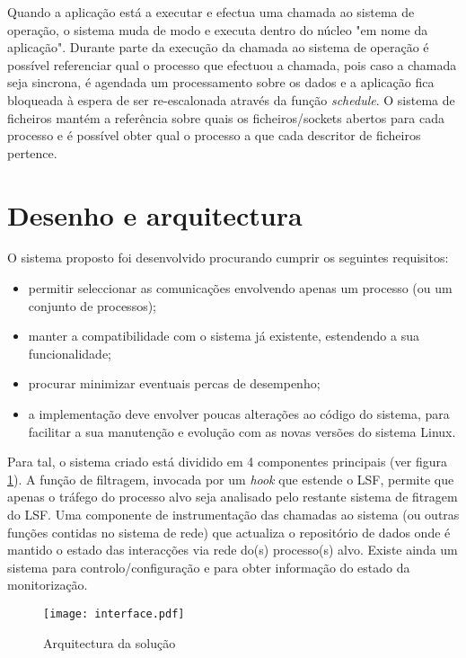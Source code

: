 Quando a aplicação está a executar e efectua uma chamada ao sistema de operação, o sistema muda de modo e executa dentro do núcleo "em nome da aplicação".
 Durante parte da execução da chamada ao sistema de operação é possível referenciar qual o processo que efectuou a chamada, pois caso a chamada seja sincrona, é agendada um processamento sobre os dados e a aplicação fica bloqueada à espera de ser re-escalonada através da função \textit{schedule}.
 O sistema de ficheiros mantém a referência sobre quais os ficheiros/sockets abertos para cada processo e é possível obter qual o processo a que cada descritor de ficheiros pertence. %

\section{Desenho e arquitectura}
\label{sec:architecture}

O sistema proposto foi desenvolvido procurando cumprir os seguintes requisitos:
\begin{itemize}
\item permitir seleccionar as comunicações envolvendo apenas um processo (ou um conjunto de processos);
\item manter a compatibilidade com o sistema já existente, estendendo a sua funcionalidade;
\item procurar minimizar eventuais percas de desempenho;
\item a implementação deve envolver poucas alterações ao código do sistema, para facilitar a sua manutenção e evolução com as novas versões do sistema Linux.
\end{itemize}

Para tal, o sistema criado está dividido em 4 componentes principais (ver figura \ref{arquitectura}). A função de filtragem, invocada por um \textit{hook} que estende o LSF, permite que apenas o tráfego do processo alvo seja analisado pelo restante sistema de fitragem do LSF. Uma componente de instrumentação das chamadas ao sistema (ou outras funções contidas no sistema de rede) que actualiza o repositório de dados onde é mantido o estado das interacções via rede do(s) processo(s) alvo. Existe ainda um sistema para controlo/configuração e para obter informação do estado da monitorização.

\begin{figure}[htbp]
\begin{center}
\texttt{[image: interface.pdf]} 
\caption{Arquitectura da solução}
\label{arquitectura}
\end{center}
\end{figure}


